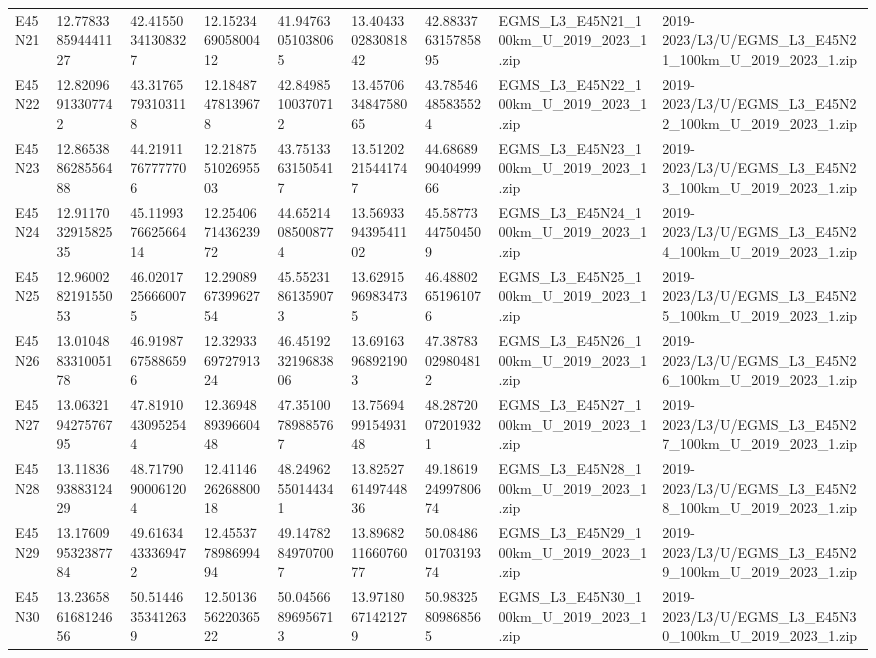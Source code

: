 \begin{landscape}
\begin{longtable}{lllllllll}
E45N21 & 12.778338594441127 & 42.41550341308327 & 12.152346905800412 & 41.94763051038065 & 13.404330283081842 & 42.883376315785895 & EGMS\_L3\_E45N21\_100km\_U\_2019\_2023\_1.zip & 2019-2023/L3/U/EGMS\_L3\_E45N21\_100km\_U\_2019\_2023\_1.zip \\
E45N22 & 12.82096913307742 & 43.31765793103118 & 12.18487478139678 & 42.84985100370712 & 13.457063484758065 & 43.78546485835524 & EGMS\_L3\_E45N22\_100km\_U\_2019\_2023\_1.zip & 2019-2023/L3/U/EGMS\_L3\_E45N22\_100km\_U\_2019\_2023\_1.zip \\
E45N23 & 12.865388628556488 & 44.21911767777706 & 12.218755102695503 & 43.75133631505417 & 13.51202215441747 & 44.686899040499966 & EGMS\_L3\_E45N23\_100km\_U\_2019\_2023\_1.zip & 2019-2023/L3/U/EGMS\_L3\_E45N23\_100km\_U\_2019\_2023\_1.zip \\
E45N24 & 12.911703291582535 & 45.119937662566414 & 12.254067143623972 & 44.65214085008774 & 13.569339439541102 & 45.58773447504509 & EGMS\_L3\_E45N24\_100km\_U\_2019\_2023\_1.zip & 2019-2023/L3/U/EGMS\_L3\_E45N24\_100km\_U\_2019\_2023\_1.zip \\
E45N25 & 12.960028219155053 & 46.02017256660075 & 12.290896739962754 & 45.55231861359073 & 13.62915969834735 & 46.48802651961076 & EGMS\_L3\_E45N25\_100km\_U\_2019\_2023\_1.zip & 2019-2023/L3/U/EGMS\_L3\_E45N25\_100km\_U\_2019\_2023\_1.zip \\
E45N26 & 13.010488331005178 & 46.91987675886596 & 12.329336972791324 & 46.451923219683806 & 13.69163968921903 & 47.38783029804812 & EGMS\_L3\_E45N26\_100km\_U\_2019\_2023\_1.zip & 2019-2023/L3/U/EGMS\_L3\_E45N26\_100km\_U\_2019\_2023\_1.zip \\
E45N27 & 13.063219427576795 & 47.81910430952544 & 12.369488939660448 & 47.35100789885767 & 13.756949915493148 & 48.28720072019321 & EGMS\_L3\_E45N27\_100km\_U\_2019\_2023\_1.zip & 2019-2023/L3/U/EGMS\_L3\_E45N27\_100km\_U\_2019\_2023\_1.zip \\
E45N28 & 13.118369388312429 & 48.71790900061204 & 12.411462626880018 & 48.24962550144341 & 13.825276149744836 & 49.186192499780674 & EGMS\_L3\_E45N28\_100km\_U\_2019\_2023\_1.zip & 2019-2023/L3/U/EGMS\_L3\_E45N28\_100km\_U\_2019\_2023\_1.zip \\
E45N29 & 13.176099532387784 & 49.61634433369472 & 12.455377898699494 & 49.14782849707007 & 13.896821166076077 & 50.084860170319374 & EGMS\_L3\_E45N29\_100km\_U\_2019\_2023\_1.zip & 2019-2023/L3/U/EGMS\_L3\_E45N29\_100km\_U\_2019\_2023\_1.zip \\
E45N30 & 13.236586168124656 & 50.51446353412639 & 12.501365622036522 & 50.04566896956713 & 13.97180671421279 & 50.98325809868565 & EGMS\_L3\_E45N30\_100km\_U\_2019\_2023\_1.zip & 2019-2023/L3/U/EGMS\_L3\_E45N30\_100km\_U\_2019\_2023\_1.zip \\

\end{longtable}
\end{landscape}

